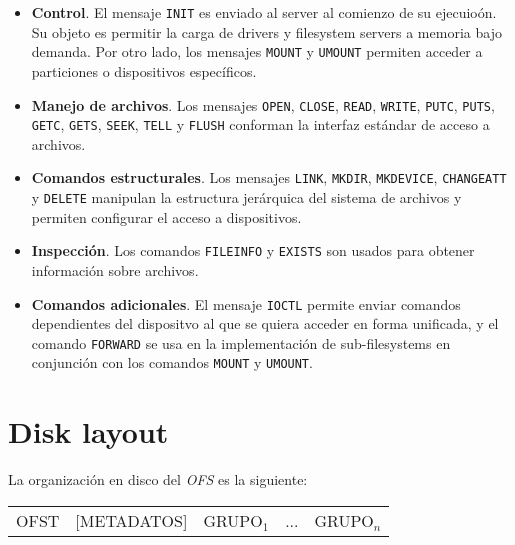 \documentclass[11pt, letterpaper, twoside]{book}
\begin{document}
\begin{itemize}

\item[] \textbf{Control}. El mensaje \texttt{INIT} es enviado al server al comienzo de su ejecuio\'on. Su objeto es permitir la carga de drivers y filesystem servers a memoria bajo demanda. Por otro lado, los mensajes \texttt{MOUNT} y \texttt{UMOUNT} permiten acceder a particiones o dispositivos espec\'ificos.
\item[] \textbf{Manejo de archivos}. Los mensajes \texttt{OPEN}, \texttt{CLOSE}, \texttt{READ}, \texttt{WRITE}, \texttt{PUTC}, \texttt{PUTS}, \texttt{GETC}, \texttt{GETS}, \texttt{SEEK}, \texttt{TELL} y \texttt{FLUSH} conforman la interfaz est\'andar de acceso a archivos.
\item[] \textbf{Comandos estructurales}. Los mensajes \texttt{LINK}, \texttt{MKDIR}, \texttt{MKDEVICE}, \texttt{CHANGEATT} y \texttt{DELETE} manipulan la estructura jer\'arquica del sistema de archivos y permiten configurar el acceso a dispositivos.
\item[] \textbf{Inspecci\'on}. Los comandos \texttt{FILEINFO} y \texttt{EXISTS} son usados para obtener informaci\'on sobre archivos.
\item[] \textbf{Comandos adicionales}. El mensaje \texttt{IOCTL} permite enviar comandos dependientes del dispositvo al que se quiera acceder en forma unificada, y el comando \texttt{FORWARD} se usa en la implementaci\'on de sub-filesystems en conjunci\'on con los comandos \texttt{MOUNT} y \texttt{UMOUNT}.

\end{itemize}

\section{Disk layout}

La organizaci\'on en disco del \emph{OFS} es la siguiente:

\begin{center}
\begin{tabular}{c|c|c|c|c}
OFST & [METADATOS] & GRUPO$_1$ & ... & GRUPO$_n$
\end{tabular}
\end{center}
\end{document}
